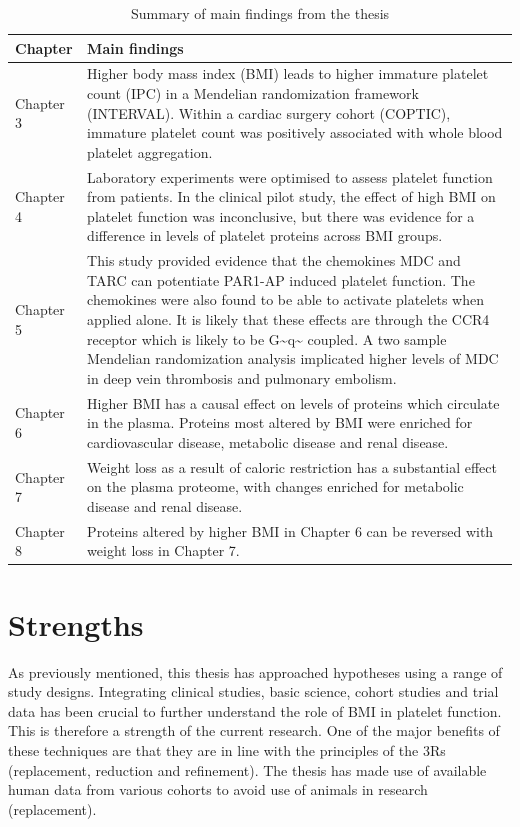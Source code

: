 \documentclass[11pt,twoside]{bristolthesis}
\begin{document}
\begin{table}

\caption{\label{tab:main-thesis-findings}Summary of main findings from the thesis}
\centering
\begin{tabu} to 
\toprule
Chapter & Main findings\\
\midrule
Chapter 3 & Higher body mass index (BMI) leads to higher immature platelet count (IPC) in a Mendelian randomization framework (INTERVAL). Within a cardiac surgery cohort (COPTIC), immature platelet count was positively associated with whole blood platelet aggregation.\\
Chapter 4 & Laboratory experiments were optimised to assess platelet function from patients. In the clinical pilot study, the effect of high BMI on platelet function was inconclusive, but there was evidence for a difference in levels of platelet proteins across BMI groups.\\
Chapter 5 & This study provided evidence that the chemokines MDC and TARC can potentiate PAR1-AP induced platelet function. The chemokines were also found to be able to activate platelets when applied alone. It is likely that these effects are through the CCR4 receptor which is likely to be G\textasciitilde{}q\textasciitilde{} coupled. A two sample Mendelian randomization analysis implicated higher levels of MDC in deep vein thrombosis and pulmonary embolism.\\
Chapter 6 & Higher BMI has a causal effect on levels of proteins which circulate in the plasma. Proteins most altered by BMI were enriched for cardiovascular disease, metabolic disease and renal disease.\\
Chapter 7 & Weight loss as a result of caloric restriction has a substantial effect on the plasma proteome, with changes enriched for metabolic disease and renal disease.\\
\addlinespace
Chapter 8 & Proteins altered by higher BMI in Chapter 6 can be reversed with weight loss in Chapter 7.\\
\bottomrule
\end{tabu}
\end{table}
\hypertarget{strengths}{%
\section{Strengths}\label{strengths}}

As previously mentioned, this thesis has approached hypotheses using a range of study designs. Integrating clinical studies, basic science, cohort studies and trial data has been crucial to further understand the role of BMI in platelet function. This is therefore a strength of the current research. One of the major benefits of these techniques are that they are in line with the principles of the 3Rs (replacement, reduction and refinement). The thesis has made use of available human data from various cohorts to avoid use of animals in research (replacement).
\end{document}
